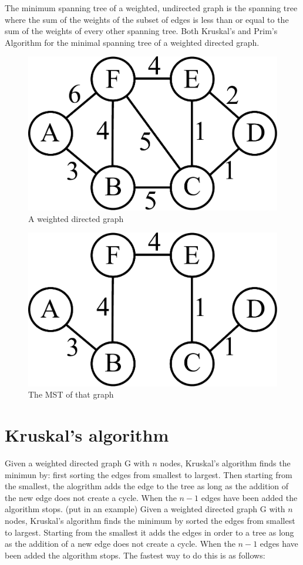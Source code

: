 The minimum spanning tree of a weighted, undirected graph is the spanning tree where the sum of the weights of the subset of edges is less than or equal to the sum of the weights of every other spanning tree.
Both Kruskal's and Prim's Algorithm for the minimal spanning tree of a weighted directed graph.

\begin{figure}[H]
\includegraphics[width = .4\textwidth]{graph4.pdf}
\caption{A weighted directed graph}
\end{figure}

\begin{figure}[H]
\includegraphics[width = .4\textwidth]{graph5.pdf}
\caption{The MST of that graph}
\end{figure}

\section*{Kruskal's algorithm}

Given a weighted directed graph G with $n$ nodes, Kruskal's algorithm finds the minimun by: first sorting the edges from smallest to largest.
Then starting from the smallest, the alogrithm adds the edge to the tree as long as the addition of the new edge does not create a cycle.
When the $n-1$ edges have been added the algorithm stops. (put in an example)
Given a weighted directed graph G with $n$ nodes, Kruskal's algorithm finds the minimum by sorted the edges from smallest to largest.
Starting from the smallest it adds the edges in order to a tree as long as the addition of a new edge does not create a cycle.
When the $n-1$ edges have been added the algorithm stops.
The fastest way to do this is as follows:

\flushleft

